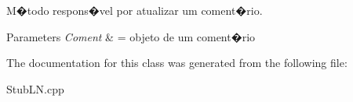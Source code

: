 M�todo respons�vel por atualizar um coment�rio. 


\begin{DoxyParams}{Parameters}
{\em Coment} & = objeto de um coment�rio \\
\hline
\end{DoxyParams}


The documentation for this class was generated from the following file\-:\begin{DoxyCompactItemize}
\item 
Stub\-L\-N.\-cpp\end{DoxyCompactItemize}
